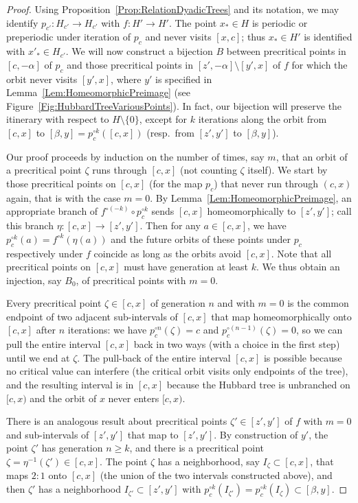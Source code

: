 \documentclass[12pt]{amsart}
\newcommand{\sm}{\setminus}
\newcommand{\0}{\texttt{0}}
\newcommand{\1}{\texttt{1}}
\theoremstyle{definition}
\numberwithin{equation}{section}
\begin{document}
\begin{proof}
Using Proposition~\ref{Prop:RelationDyadicTrees} and its notation, we may identify $p_{c'}:H_{c'}\to H_{c'}$ with $f:H'\to H'$. 
The point $x_*\in H$ is periodic or preperiodic under iteration of $p_c$ and never visits $[x,c]$; thus $x_*\in H'$ is identified with $x'_*\in H_{c'}$.   
We will now construct a bijection $B$ between precritical points in $[c,-\alpha]$ of $p_c$ and those precritical points in $[z',-\alpha]\setminus [y',x]$ of $f$ for which the orbit never visits $[y',x]$, where $y'$ is specified in Lemma~\ref{Lem:HomeomorphicPreimage} (see Figure~\ref{Fig:HubbardTreeVariousPoints}).
In fact, our bijection will preserve the itinerary with respect to $H\sm\{0\}$, except for $k$ iterations along the orbit from $[c,x]$ to $[\beta,y]=p_c^{\circ k}([c,x])$ (resp.\ from $[z',y']$ to $[\beta,y]$). 

Our proof proceeds by induction on the number of times, say $m$, that an orbit of a precritical point $\zeta$ runs through $[c,x]$ (not counting $\zeta$ itself). We start by those precritical points on $[c,x]$ (for the map $p_c$) that never run through $(c,x)$ again, that is with the case $m=0$. By Lemma~\ref{Lem:HomeomorphicPreimage}, an appropriate branch of $f^{\circ(-k)}\circ p_c^{\circ k}$ sends $[c,x]$ homeomorphically to $[z',y']$; call this branch $\eta\colon[c,x]\to [z',y']$. Then for any $a\in[c,x]$, we have $p_c^{\circ k}(a)=f^{\circ k}(\eta(a))$ and the future orbits of these points under $p_c$ respectively under $f$ coincide as long as the orbits avoid $[c,x]$. Note that all precritical points on $[c,x]$ must have generation at least $k$. We thus obtain an injection, say $B_0$, of precritical points with $m=0$.

Every precritical point $\zeta\in[c,x]$ of generation $n$ and with $m=0$ is the common endpoint of two adjacent sub-intervals of $[c,x]$ that map homeomorphically onto $[c,x]$ after $n$ iterations: we have $p_c^{\circ n}(\zeta)=c$ and $p_c^{\circ (n-1)}(\zeta)=0$, so we can pull the entire interval $[c,x]$ back in two ways (with a choice in the first step) until we end at $\zeta$. The pull-back of the entire interval $[c,x]$ is possible because no critical value can interfere (the critical orbit visits only endpoints of the tree), and the resulting interval is in $[c,x]$ because the Hubbard tree is unbranched on $[c,x)$ and the orbit of $x$ never enters $[c,x)$.

There is an analogous result about precritical points $\zeta'\in[z',y']$ of $f$ with $m=0$ and sub-intervals of $[z',y']$ that map to $[z',y']$. By construction of $y'$, the point $\zeta'$ has generation $n\ge k$, and there is a precritical point $\zeta=\eta^{-1}(\zeta')\in[c,x]$. The point $\zeta$ has a neighborhood, say $I_\zeta\subset [c,x]$, that maps $2:1$ onto $[c,x]$ (the union of the two intervals constructed above), and then $\zeta'$ has a neighborhood $I_{\zeta'}\subset[z',y']$ with $p_c^{\circ k}(I_{\zeta'})=p_c^{\circ k}(I_\zeta)\subset[\beta,y]$. 



\end{proof}
\end{document}
